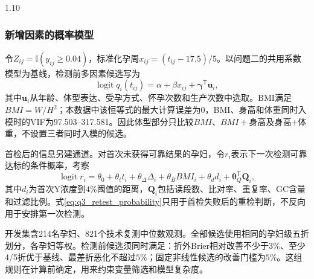 \documentclass[12pt,a4paper]{ctexrep}
\numberwithin{equation}{section}
\begin{document}
\begin{spacing}{1.10}
{			\subsubsection{新增因素的概率模型}
			令$Z_{ij}=\mathbb{I}(y_{ij}\geq0.04)$，标准化孕周$x_{ij}=(t_{ij}-17.5)/5$。以问题二的共用系数模型为基线，检测前多因素候选写为
			\begin{equation}
			\operatorname{logit}q_i(t_{ij})
			=\alpha+\beta x_{ij}+\boldsymbol{\gamma}^{\mathsf T}\boldsymbol{u}_i,
			\label{eq:q3_multifactor_probability}
			\end{equation}
			其中$\boldsymbol{u}_i$从年龄、体型表达、受孕方式、怀孕次数和生产次数中选取。BMI满足$BMI=W/H^2$；本数据中该恒等式的最大计算误差为0，BMI、身高和体重同时入模时的VIF为97.503--317.581。因此体型部分只比较$BMI$、$BMI+$身高及身高$+$体重，不设置三者同时入模的候选。

			首检后的信息另建通道。对首次未获得可靠结果的孕妇，令$r_i$表示下一次检测可靠达标的条件概率，考察
			\begin{equation}
			\operatorname{logit}r_i
			=\theta_0+\theta_t t_i+\theta_{\Delta}\Delta_i+\theta_B BMI_i
			+\theta_d d_i+\boldsymbol{\theta}_Q^{\mathsf T}\boldsymbol{Q}_i,
			\label{eq:q3_retest_probability}
			\end{equation}
			其中$d_i$为首次Y浓度到$4\%$阈值的距离，$\boldsymbol{Q}_i$包括读段数、比对率、重复率、GC含量和过滤比例。式\eqref{eq:q3_retest_probability}只用于首检失败后的重检判断，不反向用于安排第一次检测。

			开发集含214名孕妇、821个技术复测中位数观测。全部候选使用相同的孕妇级五折划分，各孕妇等权。检测前候选须同时满足：折外Brier相对改善不少于$3\%$、至少4/5折优于基线、最差折恶化不超过$5\%$；固定非线性候选的改善门槛为$5\%$。这组规则在计算前确定，用来约束变量筛选和模型复杂度。

}
\end{spacing}
\end{document}
